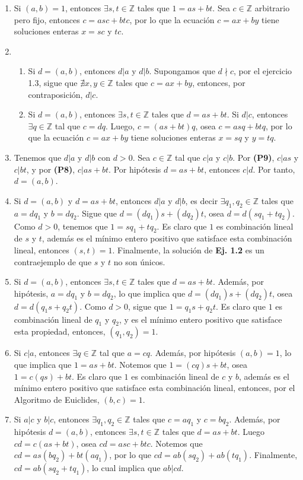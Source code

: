 \documentclass[11pt]{article}
\newcommand{\Z}{\mathbb{Z}}
\begin{document}
\begin{enumerate}[start=10]
  \item Si $(a,b)=1$, entonces $\exists s,t\in\Z$ tales que $1=as+bt$. Sea $c \in\Z$ arbitrario pero fijo, entonces $c=asc+btc$, por lo que la ecuación $c=ax+by$ tiene soluciones enteras $x=sc$ y $tc$.
  \item 
    \begin{enumerate}[label=\roman*)]
      \item Si $d=(a,b)$, entonces $d|a$ y $d|b$.   Supongamos que $d \nmid c$, por el ejercicio 1.3,   sigue que $\nexists x,y\in \Z$ tales que $c=ax+by$,   entonces, por contraposición, $d|c$.
      \item Si $d=(a,b)$, entonces  $\exists s,t\in \Z$ tales que $d=as+bt$. Si $d|c$,   entonces $\exists q\in \Z$ tal que $c=dq$. Luego,   $c=(as+bt)q$, osea $c=asq+btq$, por lo que la   ecuación $c=ax+by$ tiene soluciones enteras $x=sq$  y $y=tq$.
    \end{enumerate}
  \item Tenemos que $d|a$ y $d|b$ con $d>0$. Sea $c\in \Z$ tal que $c|a$ y $c|b$. Por \textbf{(P9)}, $c|as$ y $c|bt$, y por \textbf{(P8)}, $c|as+bt$. Por hipótesis $d=as+bt$, entonces $c|d$. Por tanto, $d=(a,b)$.
  \item Si $d=(a,b)$ y $d=as+bt$, entonces $d|a$ y $d|b$, es decir $\exists q_1, q_2 \in\Z$ tales que $a=dq_1$ y $b=dq_2$. Sigue que $d=(dq_1)s+(dq_2)t$, osea $d=d(sq_1+tq_2)$. Como $d>0$, tenemos que $1=sq_1+tq_2$. Es claro que $1$ es combinación lineal de $s$ y $t$, además es el mínimo entero positivo que satisface esta combinación lineal, entonces $(s,t)=1$. Finalmente, la solución de \textbf{Ej. 1.2} es un contraejemplo de que $s$ y $t$ no son únicos.
  \item Si $d=(a,b)$, entonces $\exists s,t\in\Z$ tales que $d=as+bt$. Además, por hipótesis, $a=dq_1$ y $b=dq_2$, lo que implica que $d=(dq_1)s+(dq_2)t$, osea $d=d(q_1s+q_2t)$. Como $d>0$, sigue que $1=q_1s+q_2t$. Es claro que $1$ es combinación lineal de $q_1$ y $q_2$, y es el mínimo entero positivo que satisface esta propiedad, entonces, $(q_1,q_2)=1$.
  \item Si $c|a$, entonces $\exists q\in\Z$ tal que $a=cq$. Además, por hipótesis $(a,b)=1$, lo que implica que $1=as+bt$. Notemos que $1=(cq)s+bt$, osea $1=c(qs)+bt$. Es claro que $1$ es combinación lineal de $c$ y $b$, además es el mínimo entero positivo que satisface esta combinación lineal, entonces,  por el Algoritmo de Euiclides, $(b,c)=1$.
  \item Si $a|c$ y $b|c$, entonces $\exists q_1, q_2 \in\Z$ tales que $c=aq_1$ y $c=bq_2$. Además, por hipótesis $d=(a,b)$, entonces $\exists s,t\in \Z$ tales que $d=as+bt$. Luego $cd=c(as+bt)$, osea $cd=asc+btc$. Notemos que $cd=as(bq_2)+bt(aq_1)$, por lo que $cd=ab(sq_2)+ab(tq_1)$. Finalmente, $cd=ab(sq_2+tq_1)$, lo cual implica que $ab|cd$.

\end{enumerate}
\end{document}
